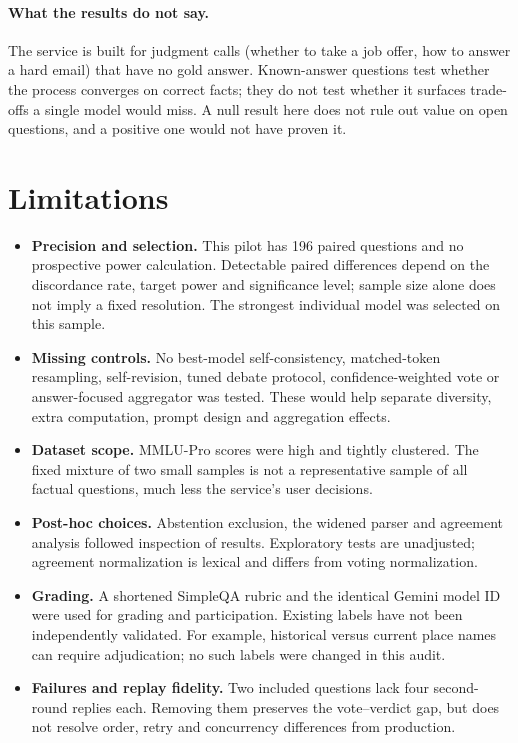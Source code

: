 \documentclass[11pt]{article}
\begin{document}
\paragraph{What the results do not say.} The service is built for judgment calls (whether to take a job offer, how to answer a hard email) that have no gold answer. Known-answer questions test whether the process converges on correct facts; they do not test whether it surfaces trade-offs a single model would miss. A null result here does not rule out value on open questions, and a positive one would not have proven it.

\section{Limitations}
\begin{itemize}
  \item \textbf{Precision and selection.} This pilot has 196 paired questions and no prospective power calculation. Detectable paired differences depend on the discordance rate, target power and significance level; sample size alone does not imply a fixed resolution. The strongest individual model was selected on this sample.
  \item \textbf{Missing controls.} No best-model self-consistency, matched-token resampling, self-revision, tuned debate protocol, confidence-weighted vote or answer-focused aggregator was tested. These would help separate diversity, extra computation, prompt design and aggregation effects.
  \item \textbf{Dataset scope.} MMLU-Pro scores were high and tightly clustered. The fixed mixture of two small samples is not a representative sample of all factual questions, much less the service's user decisions.
  \item \textbf{Post-hoc choices.} Abstention exclusion, the widened parser and agreement analysis followed inspection of results. Exploratory tests are unadjusted; agreement normalization is lexical and differs from voting normalization.
  \item \textbf{Grading.} A shortened SimpleQA rubric and the identical Gemini model ID were used for grading and participation. Existing labels have not been independently validated. For example, historical versus current place names can require adjudication; no such labels were changed in this audit.
  \item \textbf{Failures and replay fidelity.} Two included questions lack four second-round replies each. Removing them preserves the vote--verdict gap, but does not resolve order, retry and concurrency differences from production.

\end{itemize}
\end{document}
